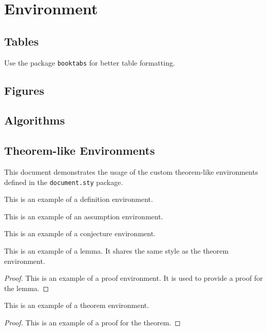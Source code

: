 \section{Environment}

\subsection{Tables}
Use the package \texttt{booktabs} for better table formatting.

\subsection{Figures}

\subsection{Algorithms}

\subsection{Theorem-like Environments}

This document demonstrates the usage of the custom theorem-like environments defined in the \texttt{document.sty} package.

\begin{definition}
  This is an example of a definition environment.
\end{definition}

\begin{assumption}
  This is an example of an assumption environment.
\end{assumption}

\begin{conjecture}
  This is an example of a conjecture environment.
\end{conjecture}

\begin{lemma}
  This is an example of a lemma. It shares the same style as the theorem environment.
\end{lemma}
\begin{proof}
  This is an example of a proof environment. It is used to provide a proof for the lemma.
\end{proof}

\begin{theorem}
  This is an example of a theorem environment. 
\end{theorem}
\begin{proof}
  This is an example of a proof for the theorem.
\end{proof}

